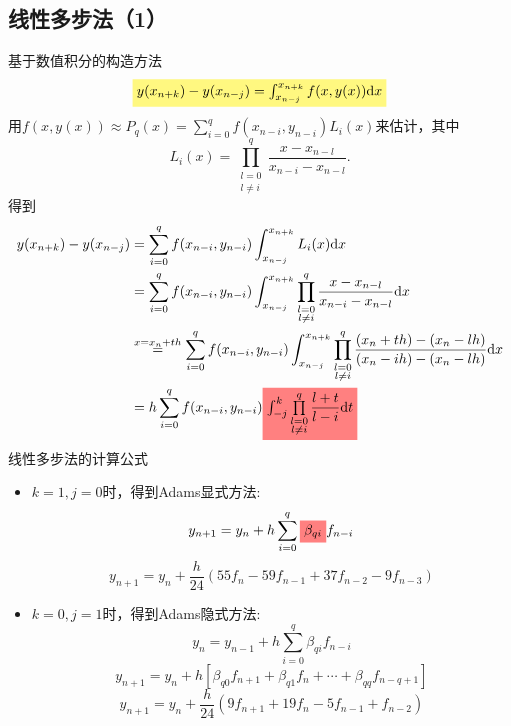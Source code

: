 \subsection{线性多步法（1）}
基于数值积分的构造方法
\[
    \colorbox{yellow!50}{$y(x_{n+k})-y(x_{n-j})=\int_{x_{n-j}}^{x_{n+k}}f(x,y(x))\mathrm{d}x$}
\]
用$f(x,y(x))\approx P_{q}(x)=\sum_{i=0}^{q}f(x_{n-i},y_{n-i})L_{i}(x)$来估计，其中
\[
    L_{i}(x)=\prod_{\substack{l=0\\ l\neq i}}^{q}\frac{x-x_{n-l}}{x_{n-i}-x_{n-l}}.
\]
得到
\[
    \begin{aligned}
        y(x_{n+k})-y(x_{n-j}) &= \sum_{i=0}^{q}f(x_{n-i},y_{n-i})\int_{x_{n-j}}^{x_{n+k}}L_{i}(x)\mathrm{d}x\\
        &=\sum_{i=0}^{q}f(x_{n-i},y_{n-i})\int_{x_{n-j}}^{x_{n+k}}\prod_{\substack{l=0\\ l\neq i}}^{q}\frac{x-x_{n-l}}{x_{n-i}-x_{n-l}}\mathrm{d}x\\
        &\overset{x = x_n+th}{=}\sum_{i=0}^{q}f(x_{n-i},y_{n-i})\int_{x_{n-j}}^{x_{n+k}}\prod_{\substack{l=0\\ l\neq i}}^{q}\frac{(x_n+th)-(x_{n}-lh)}{(x_{n}-ih)-(x_{n}-lh)}\mathrm{d}x\\
        &=h\sum_{i=0}^{q}f(x_{n-i},y_{n-i})\colorbox{red!50}{$\int_{-j}^{k}\prod\limits_{\substack{l=0\\ l\neq i}}^{q}\dfrac{l+t}{l-i}\mathrm{d}t$}
    \end{aligned}
\]
线性多步法的计算公式
\begin{itemize}
    \item $k=1,j=0$时，得到\colorbox{red!50}{Adams显式方法}:
    \[
        y_{n+1}=y_{n}+h\sum_{i=0}^{q}\colorbox{red!50}{$\beta_{qi}$}f_{n-i}
    \]
    \[
        y_{n+1}=y_{n}+\frac{h}{24}(55f_{n}-59f_{n-1}+37f_{n-2}-9f_{n-3})
    \]
    \item $k=0,j=1$时，得到\colorbox{cyan!50}{Adams隐式方法}:
    \[
        y_n=y_{n-1}+h\sum_{i=0}^q\beta_{qi}f_{n-i}
    \]
    \[
        y_{n+1}=y_n+h[\beta_{q0}f_{n+1}+\beta_{q1}f_n+\cdots+\beta_{qq}f_{n-q+1}]
    \]
    \[
        y_{n+1}=y_{n}+\frac{h}{24}(9f_{n+1}+19f_{n}-5f_{n-1}+f_{n-2})
    \]
\end{itemize}
